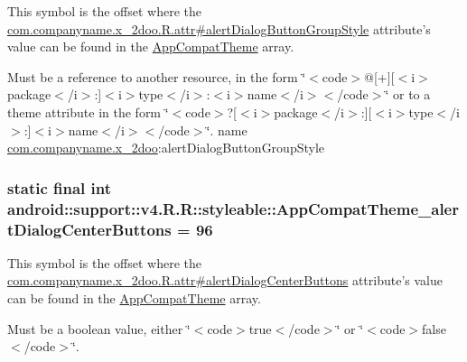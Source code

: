 This symbol is the offset where the \hyperlink{classcom_1_1companyname_1_1x__2doo_1_1_r_1_1attr_ef05b45a8e70767849d1da9e22615f23}{com.companyname.x\_\-2doo.R.attr\#alertDialogButtonGroupStyle} attribute's value can be found in the \hyperlink{classandroid_1_1support_1_1v4_1_1_r_1_1styleable_0873e92ba21076bb5a4aeadeb7f5779f}{AppCompatTheme} array.

Must be a reference to another resource, in the form \char`\"{}$<$code$>$@\mbox{[}+\mbox{]}\mbox{[}$<$i$>$package$<$/i$>$:\mbox{]}$<$i$>$type$<$/i$>$:$<$i$>$name$<$/i$>$$<$/code$>$\char`\"{} or to a theme attribute in the form \char`\"{}$<$code$>$?\mbox{[}$<$i$>$package$<$/i$>$:\mbox{]}\mbox{[}$<$i$>$type$<$/i$>$:\mbox{]}$<$i$>$name$<$/i$>$$<$/code$>$\char`\"{}.  name \hyperlink{namespacecom_1_1companyname_1_1x__2doo}{com.companyname.x\_\-2doo}:alertDialogButtonGroupStyle \hypertarget{classandroid_1_1support_1_1v4_1_1_r_1_1styleable_8ec720cdfc46d6cc33d23d0459197671}{
\subsubsection[{AppCompatTheme\_\-alertDialogCenterButtons}]{\setlength{\rightskip}{0pt plus 5cm}static final int android::support::v4.R.R::styleable::AppCompatTheme\_\-alertDialogCenterButtons = 96}}
\label{classandroid_1_1support_1_1v4_1_1_r_1_1styleable_8ec720cdfc46d6cc33d23d0459197671}


This symbol is the offset where the \hyperlink{classcom_1_1companyname_1_1x__2doo_1_1_r_1_1attr_c8d25f7c896bd02184278843bcf2816e}{com.companyname.x\_\-2doo.R.attr\#alertDialogCenterButtons} attribute's value can be found in the \hyperlink{classandroid_1_1support_1_1v4_1_1_r_1_1styleable_0873e92ba21076bb5a4aeadeb7f5779f}{AppCompatTheme} array.

Must be a boolean value, either \char`\"{}$<$code$>$true$<$/code$>$\char`\"{} or \char`\"{}$<$code$>$false$<$/code$>$\char`\"{}. 

